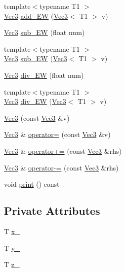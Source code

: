 \begin{DoxyCompactItemize}
{\footnotesize template$<$typename T1 $>$ }\\\mbox{\hyperlink{class_vec3}{Vec3}} \mbox{\hyperlink{class_vec3_a834f7331fe06f285a5f46211e7ed3ec2}{add\+\_\+\+EW}} (\mbox{\hyperlink{class_vec3}{Vec3}}$<$ T1 $>$ v)
\item 
\mbox{\hyperlink{class_vec3}{Vec3}} \mbox{\hyperlink{class_vec3_acf3960c03e110918c0240f8415d6a7c9}{sub\+\_\+\+EW}} (float num)
\item 
{\footnotesize template$<$typename T1 $>$ }\\\mbox{\hyperlink{class_vec3}{Vec3}} \mbox{\hyperlink{class_vec3_a234dadfe29347670784c0e7ebd8bf67f}{sub\+\_\+\+EW}} (\mbox{\hyperlink{class_vec3}{Vec3}}$<$ T1 $>$ v)
\item 
\mbox{\hyperlink{class_vec3}{Vec3}} \mbox{\hyperlink{class_vec3_a6db31460c486f49e40eec82ff488b55e}{div\+\_\+\+EW}} (float num)
\item 
{\footnotesize template$<$typename T1 $>$ }\\\mbox{\hyperlink{class_vec3}{Vec3}} \mbox{\hyperlink{class_vec3_a8ff6abb7455120c1884bf126e2083d29}{div\+\_\+\+EW}} (\mbox{\hyperlink{class_vec3}{Vec3}}$<$ T1 $>$ v)
\item 
\mbox{\hyperlink{class_vec3_aea7744cd6c8f225b4cd6205b11ca5b46}{Vec3}} (const \mbox{\hyperlink{class_vec3}{Vec3}} \&v)
\item 
\mbox{\hyperlink{class_vec3}{Vec3}} \& \mbox{\hyperlink{class_vec3_a4ffd4490e1f59f88447f92083e6e7072}{operator=}} (const \mbox{\hyperlink{class_vec3}{Vec3}} \&v)
\item 
\mbox{\hyperlink{class_vec3}{Vec3}} \& \mbox{\hyperlink{class_vec3_a8501af04a24777f846b3ddcda6bf0705}{operator+=}} (const \mbox{\hyperlink{class_vec3}{Vec3}} \&rhs)
\item 
\mbox{\hyperlink{class_vec3}{Vec3}} \& \mbox{\hyperlink{class_vec3_ae9cb727000423d7def58bfba67f39099}{operator-\/=}} (const \mbox{\hyperlink{class_vec3}{Vec3}} \&rhs)
\item 
void \mbox{\hyperlink{class_vec3_af10c9e364bdec9abd60045bf3d523293}{print}} () const
\end{DoxyCompactItemize}
\subsection*{Private Attributes}
\begin{DoxyCompactItemize}
\item 
T \mbox{\hyperlink{class_vec3_ad6cc034d7eca8bb25a752db1c7a11c1a}{x\+\_\+}}
\item 
T \mbox{\hyperlink{class_vec3_a6371aee198bf180525adde8ab4653070}{y\+\_\+}}
\item 
T \mbox{\hyperlink{class_vec3_afc4b262f25e6f72277a191e0d818e1e3}{z\+\_\+}}
\end{DoxyCompactItemize}
